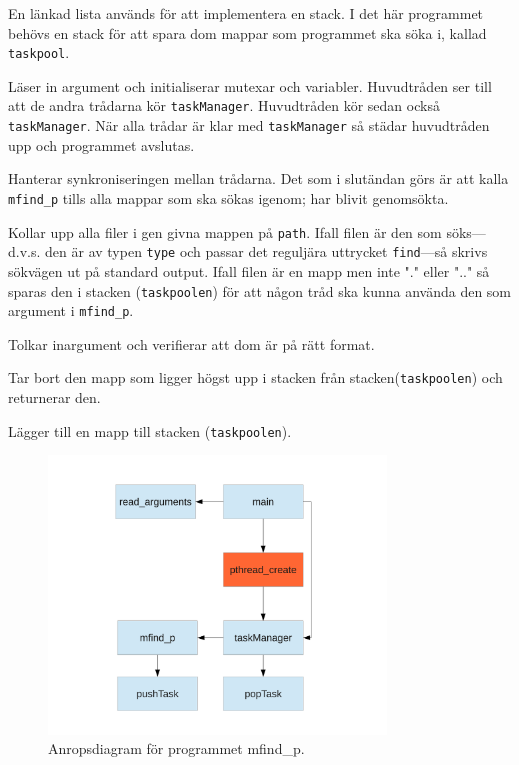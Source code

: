 
En länkad lista används för att implementera en stack. I det här programmet behövs en stack för att
spara dom mappar som programmet ska söka i, kallad \texttt{taskpool}.


Läser in argument och initialiserar mutexar och variabler. Huvudtråden ser till att de andra trådarna
kör \texttt{taskManager}. Huvudtråden kör sedan också \texttt{taskManager}. När alla trådar är klar med \texttt{taskManager} så städar huvudtråden upp och programmet avslutas.

Hanterar synkroniseringen mellan trådarna. Det som i slutändan görs är att kalla \texttt{mfind\_p}
tills alla mappar som ska sökas igenom; har blivit genomsökta.

Kollar upp alla filer i gen givna mappen på \texttt{path}. Ifall filen är den som söks---d.v.s. den är av typen \texttt{type} och passar det reguljära uttrycket \texttt{find}---så skrivs sökvägen
ut på standard output. Ifall filen är en mapp men inte "." eller ".." så sparas den i stacken (\texttt{taskpoolen}) för att någon tråd ska kunna använda den som argument i \texttt{mfind\_p}. 

Tolkar inargument och verifierar att dom är på rätt format.

Tar bort den mapp som ligger högst upp i stacken från stacken(\texttt{taskpoolen}) och returnerar den.

Lägger till en mapp till stacken (\texttt{taskpoolen}).

\begin{figure}[h!]
	\centering
	\includegraphics[width=0.8\textwidth]{img/anropsdiagram}
	\caption{Anropsdiagram för programmet mfind\_p.}
	\label{fig:anropsdiagram}
\end{figure}

